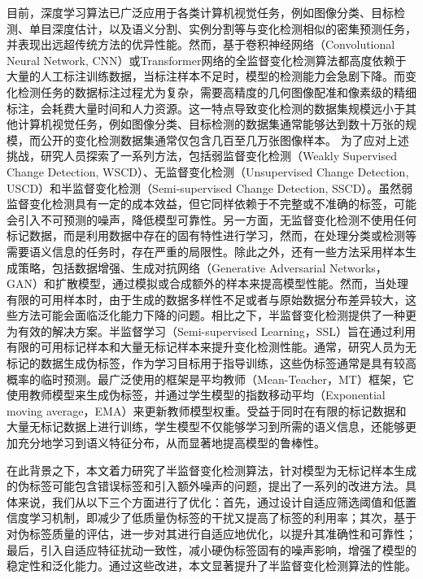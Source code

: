 \documentclass[lang=chs, degree=master, blindreview=false, adobe=false]{yanputhesis}
\begin{document}
目前，深度学习算法已广泛应用于各类计算机视觉任务，例如图像分类、目标检测、单目深度估计，以及语义分割、实例分割等与变化检测相似的密集预测任务，并表现出远超传统方法的优异性能。然而，基于卷积神经网络\cite{daudt2018FC-EF}\cite{BIFA2024}\cite{crossRES2023szw}（Convolutional Neural Network, CNN）或Transformer网络\cite{chen2021BIT}\cite{Bandara2022changeformer}的全监督变化检测算法都高度依赖于大量的人工标注训练数据，当标注样本不足时，模型的检测能力会急剧下降。而变化检测任务的数据标注过程尤为复杂，需要高精度的几何图像配准和像素级的精细标注，会耗费大量时间和人力资源。这一特点导致变化检测的数据集规模远小于其他计算机视觉任务，例如图像分类、目标检测的数据集通常能够达到数十万张的规模，而公开的变化检测数据集通常仅包含几百至几万张图像样本。
为了应对上述挑战，研究人员探索了一系列方法，包括弱监督变化检测\cite{wu2023fcdgan}\cite{WSCD_TGRS24}\cite{WSCD_TGRS24_2}（Weakly Supervised Change Detection, WSCD）、无监督变化检测\cite{bandara2023USCD}\cite{USCD_JSTARS23}\cite{USCD_TGRS22}（Unsupervised Change Detection, USCD）和半监督变化检测\cite{peng2021SemiCDNet}\cite{bandara2022RCR}\cite{Zhang2023FPA}（Semi-supervised Change Detection, SSCD）。虽然弱监督变化检测具有一定的成本效益，但它同样依赖于不完整或不准确的标签，可能会引入不可预测的噪声，降低模型可靠性。另一方面，无监督变化检测不使用任何标记数据，而是利用数据中存在的固有特性进行学习，然而，在处理分类或检测等需要语义信息的任务时，存在严重的局限性。除此之外，还有一些方法采用样本生成策略，包括数据增强\cite{IAug2022}\cite{augmentaion_23}、生成对抗网络\cite{gen_sample_TGRS21}（Generative Adversarial Networks，GAN）和扩散模型\cite{bandara2022ddpm}，通过模拟或合成额外的样本来提高模型性能。然而，当处理有限的可用样本时，由于生成的数据多样性不足或者与原始数据分布差异较大，这些方法可能会面临泛化能力下降的问题。相比之下，半监督变化检测提供了一种更为有效的解决方案。半监督学习\cite{Tarvainen2017teacher}\cite{ran2023DTFSeg}\cite{ran2024semi}（Semi-supervised Learning，SSL）旨在通过利用有限的可用标记样本和大量无标记样本来提升变化检测性能。通常，研究人员为无标记的数据生成伪标签，作为学习目标用于指导训练，这些伪标签通常是具有较高概率的临时预测。最广泛使用的框架是平均教师\cite{Tarvainen2017teacher}（Mean-Teacher，MT）框架，它使用教师模型来生成伪标签，并通过学生模型的指数移动平均\cite{cai2021ema}（Exponential moving average，EMA）来更新教师模型权重。受益于同时在有限的标记数据和大量无标记数据上进行训练，学生模型不仅能够学习到所需的语义信息，还能够更加充分地学习到语义特征分布，从而显著地提高模型的鲁棒性。

在此背景之下，本文着力研究了半监督变化检测算法，针对模型为无标记样本生成的伪标签可能包含错误标签和引入额外噪声的问题，提出了一系列的改进方法。具体来说，我们从以下三个方面进行了优化：首先，通过设计自适应筛选阈值和低置信度学习机制，即减少了低质量伪标签的干扰又提高了标签的利用率；其次，基于对伪标签质量的评估，进一步对其进行自适应地优化，以提升其准确性和可靠性；最后，引入自适应特征扰动一致性，减小硬伪标签固有的噪声影响，增强了模型的稳定性和泛化能力。通过这些改进，本文显著提升了半监督变化检测算法的性能。
\end{document}
